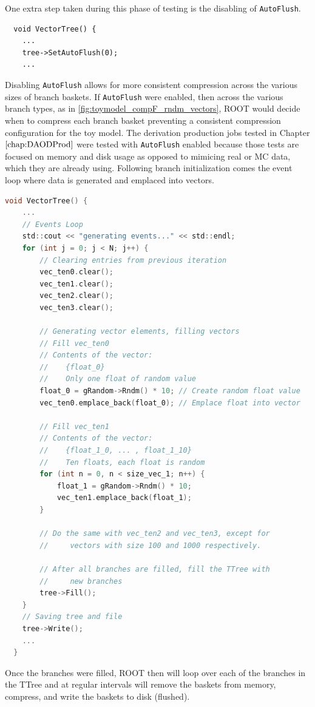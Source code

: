 One extra step taken during this phase of testing is the disabling of \verb|AutoFlush|. 
\begin{lstlisting}
  void VectorTree() {
    ...
    tree->SetAutoFlush(0);
    ...
\end{lstlisting}
Disabling \verb|AutoFlush| allows for more consistent compression across the various sizes of branch baskets. 
If \verb|AutoFlush| were enabled, then across the various branch types, as in \ref{fig:toymodel_compF_rndm_vectors}, ROOT would decide when to compress each branch basket preventing a consistent compression configuration for the toy model.  
The derivation production jobs tested in Chapter $\ref{chap:DAODProd}$ were tested with \verb|AutoFlush| enabled because those tests are focused on memory and disk usage as opposed to mimicing real or MC data, which they are already using.
Following branch initialization comes the event loop where data is generated and emplaced into vectors.

\begin{lstlisting}[language=C]  
  void VectorTree() {
    ...
    // Events Loop
    std::cout << "generating events..." << std::endl;
    for (int j = 0; j < N; j++) {
        // Clearing entries from previous iteration
        vec_ten0.clear();
        vec_ten1.clear();
        vec_ten2.clear();
        vec_ten3.clear();

        // Generating vector elements, filling vectors
        // Fill vec_ten0 
        // Contents of the vector:
        //    {float_0}
        //    Only one float of random value
        float_0 = gRandom->Rndm() * 10; // Create random float value
        vec_ten0.emplace_back(float_0); // Emplace float into vector
        
        // Fill vec_ten1
        // Contents of the vector:
        //    {float_1_0, ... , float_1_10}
        //    Ten floats, each float is random
        for (int n = 0, n < size_vec_1; n++) {
            float_1 = gRandom->Rndm() * 10;
            vec_ten1.emplace_back(float_1);
        }

        // Do the same with vec_ten2 and vec_ten3, except for 
        //     vectors with size 100 and 1000 respectively. 
        
        // After all branches are filled, fill the TTree with 
        //     new branches
        tree->Fill();
    }
    // Saving tree and file
    tree->Write();
    ...
  }
\end{lstlisting}
Once the branches were filled, ROOT then will loop over each of the branches in the TTree and at regular intervals will remove the baskets from memory, compress, and write the baskets to disk (flushed).


